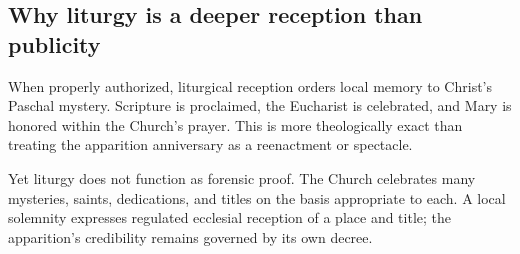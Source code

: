 \subsection{Why liturgy is a deeper reception than publicity}

When properly authorized, liturgical reception orders local memory to Christ's Paschal mystery. Scripture is proclaimed, the Eucharist is celebrated, and Mary is honored within the Church's prayer. This is more theologically exact than treating the apparition anniversary as a reenactment or spectacle.

Yet liturgy does not function as forensic proof. The Church celebrates many mysteries, saints, dedications, and titles on the basis appropriate to each. A local solemnity expresses regulated ecclesial reception of a place and title; the apparition's credibility remains governed by its own decree.
